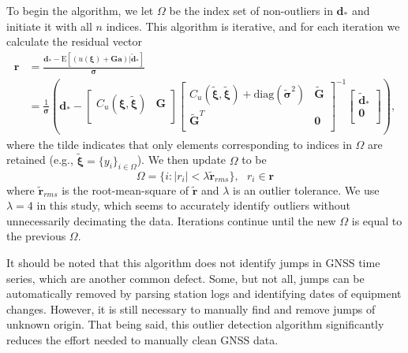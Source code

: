 \documentclass[10pt,letter]{article}
\begin{document}
To begin the algorithm, we let $\Omega$ be the index set of non-outliers in $\bm{d}_*$ and initiate it with all $n$ indices. This algorithm is iterative, and for each iteration we calculate the residual vector
\begin{align}\label{eq:Residual}
\bm{r} &= \frac{\bm{d}_* - \mathrm{E}\left[(u(\bm{\xi}) + \bm{G}\bm{a})|\tilde{\bm{d}}_* \right]}{\bm{\sigma}} \\
       &= \frac{1}{\bm{\sigma}}\left(\bm{d}_*  - 
          \left[\begin{array}{cc}
                C_u(\bm{\xi},\tilde{\bm{\xi}}) & \bm{G} \\
                \end{array}\right]
          \left[\begin{array}{cc}
                C_u(\tilde{\bm{\xi}},\tilde{\bm{\xi}}) + \mathrm{diag}(\tilde{\bm{\sigma}}^2) & \tilde{\bm{G}} \\
                \tilde{\bm{G}}^T  & \bm{0} \\
                \end{array}\right]^{-1}
          \left[\begin{array}{c}
                \tilde{\bm{d}}_* \\
                \bm{0} \\
                \end{array}\right]\right),
\end{align}
where the tilde indicates that only elements corresponding to indices in $\Omega$ are retained (e.g., $\tilde{\bm{\xi}} = \{y_i\}_{i\in\Omega}$). We then update $\Omega$ to be
\begin{equation}\label{eq:Update}
\Omega = \{i : |r_i| < \lambda \tilde{\bm{r}}_{rms}\}, \ \ \ r_i \in \bm{r}
\end{equation} 
where $\tilde{\bm{r}}_{rms}$ is the root-mean-square of $\tilde{\bm{r}}$ and $\lambda$ is an outlier tolerance. We use $\lambda=4$ in this study, which seems to accurately identify outliers without unnecessarily decimating the data. Iterations continue until the new $\Omega$ is equal to the previous $\Omega$. 

It should be noted that this algorithm does not identify jumps in GNSS time series, which are another common defect. Some, but not all, jumps can be automatically removed by parsing station logs and identifying dates of equipment changes. However, it is still necessary to manually find and remove jumps of unknown origin. That being said, this outlier detection algorithm significantly reduces the effort needed to manually clean GNSS data.       
\end{document}
